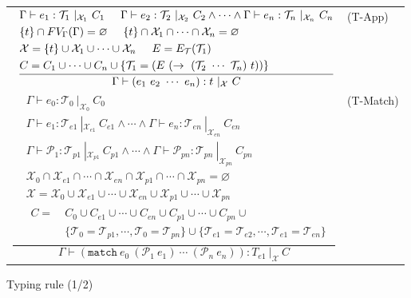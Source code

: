 \documentclass{article}
\begin{document}
\begin{figure}[tb]
\begin{tabular}{rlrl}
        \multicolumn{3}{r}{
        $\dfrac{
            \begin{aligned}
                &\Gamma \vdash e_1 : \mathcal{T}_1\ |_{\mathcal{X}_1}\ C_1 \hspace{5mm}
                    \Gamma \vdash e_2 : \mathcal{T}_2\ |_{\mathcal{X}_2}\ C_2 \land \cdots \land \Gamma \vdash e_n : \mathcal{T}_n\ |_{\mathcal{X}_n}\ C_n \\
                &\{t\} \cap FV_\Gamma(\Gamma) = \varnothing \hspace{5mm} \{t\} \cap \mathcal{X}_1 \cap \cdots \cap \mathcal{X}_n = \varnothing\\
                &\mathcal{X} = \{t\} \cup \mathcal{X}_1 \cup \cdots \cup \mathcal{X}_n \hspace{5mm} E = E_\mathcal{T}(\mathcal{T}_1) \\
                &C = C_1 \cup \cdots \cup C_n \cup \{ \mathcal{T}_1 = (E\ (\rightarrow\ (\mathcal{T}_2\ \cdots\ \mathcal{T}_n)\ t)) \}
            \end{aligned}
        }{
            \Gamma \vdash (e_1\ e_2\ \cdots\ e_n) : t\ |_\mathcal{X}\ C
        }$} & (T-App) \vspace{5mm} \\

        \multicolumn{3}{r}{
        $\dfrac{
            \begin{aligned}
                &\Gamma \vdash e_0 : \mathcal{T}_0\ |_{\mathcal{X}_0}\ C_0 \\
                &\Gamma \vdash e_1 : \mathcal{T}_{e1}\ |_{\mathcal{X}_{e1}}\ C_{e1} \land \cdots \land \Gamma \vdash e_n : \mathcal{T}_{en}\ |_{\mathcal{X}_{en}}\ C_{en} \\
                &\Gamma \vdash \mathcal{P}_1 : \mathcal{T}_{p1}\ |_{\mathcal{X}_{p1}}\ C_{p1} \land \cdots \land \Gamma \vdash \mathcal{P}_{pn} : \mathcal{T}_{pn}\ |_{\mathcal{X}_{pn}}\ C_{pn} \\
                &\mathcal{X}_0 \cap \mathcal{X}_{e1} \cap \cdots \cap \mathcal{X}_{en} \cap \mathcal{X}_{p1} \cap \cdots \cap \mathcal{X}_{pn} = \varnothing \\
                &\mathcal{X} = \mathcal{X}_0 \cup \mathcal{X}_{e1} \cup \cdots \cup \mathcal{X}_{en} \cup \mathcal{X}_{p1} \cup \cdots \cup \mathcal{X}_{pn} \\
                &\begin{aligned}
                    C =\ &C_0 \cup C_{e1} \cup \cdots \cup C_{en} \cup C_{p1} \cup \cdots \cup C_{pn} \cup \\
                         &\{\mathcal{T}_0 = \mathcal{T}_{p1}, \cdots, \mathcal{T}_0 = \mathcal{T}_{pn}\} \cup
                         \{\mathcal{T}_{e1} = \mathcal{T}_{e2}, \cdots, \mathcal{T}_{e1} = \mathcal{T}_{en}\}
                \end{aligned}
            \end{aligned}
        }{
            \Gamma \vdash (\mathtt{match}\ e_0\ (\mathcal{P}_1\ e_1)\ \cdots\ (\mathcal{P}_n\ e_n)) : T_{e1}\ |_\mathcal{X}\ C
        }$} & (T-Match)
    \end{tabular}
    \caption{Typing rule (1/2)}
    \label{fig:typing1}
\end{figure}
\end{document}
